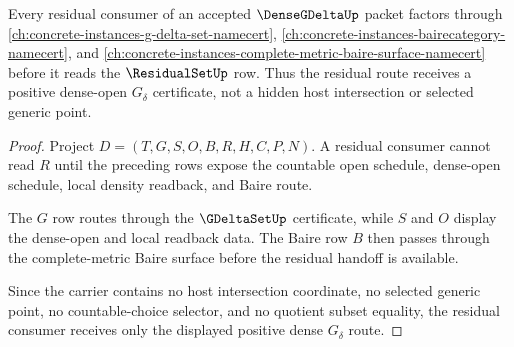 \begin{theorem}
\label{thm:dense-gdelta-residual-handoff}
Every residual consumer of an accepted $\DenseGDeltaUp$ packet factors through \autoref{ch:concrete-instances-g-delta-set-namecert}, \autoref{ch:concrete-instances-bairecategory-namecert}, and \autoref{ch:concrete-instances-complete-metric-baire-surface-namecert} before it reads the $\ResidualSetUp$ row. Thus the residual route receives a positive dense-open $G_\delta$ certificate, not a hidden host intersection or selected generic point.
\end{theorem}
\begin{proof}
Project $D=(T,G,S,O,B,R,H,C,P,N)$. A residual consumer cannot read $R$ until the preceding rows expose the countable open schedule, dense-open schedule, local density readback, and Baire route.

The $G$ row routes through the $\GDeltaSetUp$ certificate, while $S$ and $O$ display the dense-open and local readback data. The Baire row $B$ then passes through the complete-metric Baire surface before the residual handoff is available.

Since the carrier contains no host intersection coordinate, no selected generic point, no countable-choice selector, and no quotient subset equality, the residual consumer receives only the displayed positive dense $G_\delta$ route.
\end{proof}


\begin{closurestatus}{\DenseGDeltaUp}
  \theoryclosure{\seedClosure}
  \formalstatus{\unformalizedV}
\end{closurestatus}
